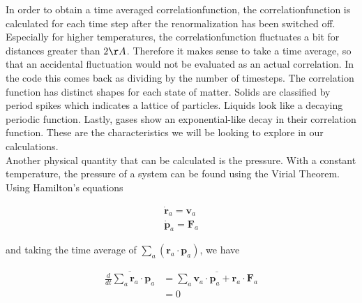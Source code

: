 \documentclass{article}
\begin{document}
\begin{multicols}{2}
In order to obtain a time averaged correlationfunction, the correlationfunction is calculated for each time step after the renormalization has been switched off. Especially for higher temperatures, the correlationfunction fluctuates a bit for distances greater than $2\AA$. Therefore it makes sense to take a time average, so that an accidental fluctuation would not be evaluated as an actual correlation. In the code this comes back as dividing by the number of timesteps.
The correlation function has distinct shapes for each state of matter.  Solids are classified by period spikes which indicates a lattice of particles.  Liquids look like a decaying periodic function.  Lastly, gases show an exponential-like decay in their correlation function.  These are the characteristics we will be looking to explore in our calculations. \\



Another physical quantity that can be calculated is the pressure.  With a constant temperature, the pressure of a system can be found using the Virial Theorem.  Using Hamilton's equations

\begin{equation}
\begin{split}
\dot{\textbf{r}}_a = \textbf{v}_a \\
\dot{\textbf{p}}_a = \textbf{F}_a 
\end{split}
\end{equation}

\noindent and taking the time average of $\sum \limits _a (\textbf{r}_a \cdot \textbf{p}_a)$, we have

\begin{equation}
\begin{split}
\overline{\frac{d}{dt} \sum \limits _a \textbf{r}_a \cdot \textbf{p}_a} & = \overline{\sum \limits _a \textbf{v}_a \cdot \textbf{p}_a + \textbf{r}_a \cdot \textbf{F}_a} \\
& = 0
\end{split}
\end{equation}


\end{multicols}
\end{document}
